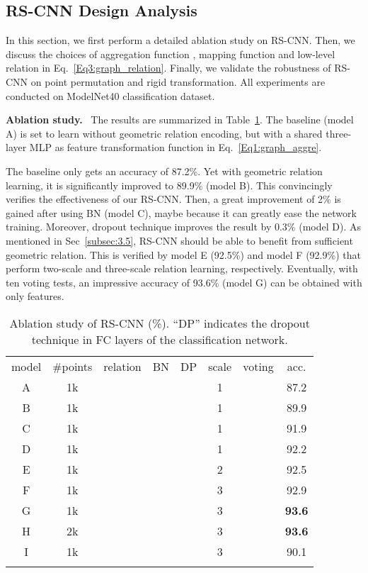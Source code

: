 \documentclass[10pt,twocolumn,letterpaper]{article}
\begin{document}
\subsection{RS-CNN Design Analysis}
\label{subsec4.2}
In this section, we first perform a detailed ablation study on RS-CNN. Then, we discuss the choices of aggregation function , mapping function  and low-level relation  in Eq.~\eqref{Eq3:graph_relation}. Finally, we validate the robustness of RS-CNN on point permutation and rigid transformation. All experiments are conducted on ModelNet40 classification dataset.

\vspace{12pt}
\noindent \textbf{Ablation study.}\,\,~The results are summarized in Table~\ref{Tab4:ablation}. The baseline (model A) is set to learn without geometric relation encoding, but with a shared three-layer MLP as feature transformation function  in Eq.~\eqref{Eq1:graph_aggre}.

The baseline only gets an accuracy of 87.2\%. Yet with geometric relation learning, it is significantly improved to 89.9\% (model B). This convincingly verifies the effectiveness of our RS-CNN. Then, a great improvement of 2\% is gained after using BN (model C), maybe because it can greatly ease the network training. Moreover, dropout technique improves the result by 0.3\% (model D). As mentioned in Sec~\ref{subsec:3.5}, RS-CNN should be able to benefit from sufficient geometric relation. This is verified by model E (92.5\%) and model F (92.9\%) that perform two-scale and three-scale relation learning, respectively. Eventually, with ten voting tests, an impressive accuracy of 93.6\% (model G) can be obtained with only  features.

\begin{table}[t]
  \centering
  \footnotesize
\caption{Ablation study of RS-CNN (\%). ``DP'' indicates the dropout technique in FC layers of the classification network.}
\begin{tabular}{c|cccccc|c}
  \Xhline{0.8pt}
  model & \#points & relation & BN & DP & scale & voting & acc. \\
\Xhline{0.5pt}
  A & 1k &  &  &  & 1 &  & 87.2 \\
  B & 1k &  &  &  & 1 &  & 89.9 \\
  C & 1k &  &  &  & 1 &  & 91.9 \\
  D & 1k &  &  &  & 1 &  & 92.2 \\
  E & 1k &  &  &  & 2 &  & 92.5  \\
  F & 1k &  &  &  & 3 &  & 92.9 \\
  G & 1k &  &  &  & 3 &  & \textbf{93.6} \\
  H & 2k &  &  &  & 3 &  & \textbf{93.6} \\
  I & 1k &  &  &  & 3 &  & 90.1 \\
  \Xhline{0.8pt}
  \end{tabular}
  \label{Tab4:ablation}
\end{table}
\end{document}
